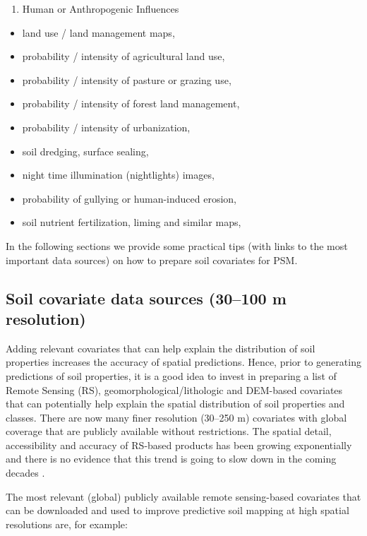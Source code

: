 \documentclass[graybox,natbib,nospthms,UStrade]{svmono}
\providecommand{\tightlist}{%
  \setlength{\itemsep}{0pt}\setlength{\parskip}{0pt}}
\providecommand{\tightlist}{\setlength{\itemsep}{0pt}\setlength{\parskip}{0pt}}
\begin{document}
\begin{enumerate}
\def\labelenumi{\arabic{enumi}.}
\setcounter{enumi}{6}
\tightlist
\item
  Human or Anthropogenic Influences
\end{enumerate}

\begin{itemize}
\tightlist
\item
  land use / land management maps,
\item
  probability / intensity of agricultural land use,
\item
  probability / intensity of pasture or grazing use,
\item
  probability / intensity of forest land management,
\item
  probability / intensity of urbanization,
\item
  soil dredging, surface sealing,
\item
  night time illumination (nightlights) images,
\item
  probability of gullying or human-induced erosion,
\item
  soil nutrient fertilization, liming and similar maps,
\end{itemize}

In the following sections we provide some practical tips (with links to the most important data sources) on how to prepare soil covariates for PSM.

\hypertarget{soil-covs-30m}{%
\subsection{Soil covariate data sources (30--100 m resolution)}\label{soil-covs-30m}}

Adding relevant covariates that can help explain the distribution of soil properties increases the accuracy of spatial predictions. Hence, prior to generating predictions of soil properties, it is a good idea to invest in preparing a list of Remote Sensing (RS), geomorphological/lithologic and DEM-based covariates that can potentially help explain the spatial distribution of soil properties and classes. There are now many finer resolution (30--250 m) covariates with global coverage that are publicly available without restrictions. The spatial detail, accessibility and accuracy of RS-based products has been growing exponentially and there is no evidence that this trend is going to slow down in the coming decades \citep{Herold2016}.

The most relevant (global) publicly available remote sensing-based covariates that can be downloaded and used to improve predictive soil mapping at high spatial resolutions are, for example:
\end{document}
